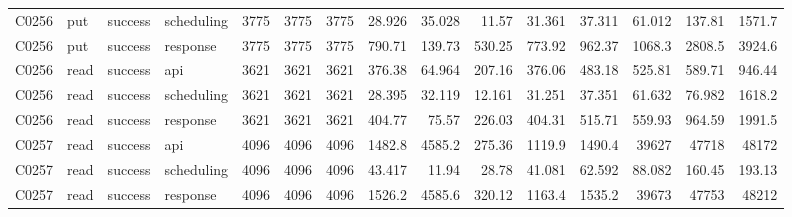 \begin{landscape}
\begin{longtable}{llllrrrrrrrrrrr}
C0256 & put & success & scheduling & 3775 & 3775 & 3775 & 28.926 & 35.028 & 11.57 & 31.361 & 37.311 & 61.012 & 137.81 & 1571.7\\
C0256 & put & success & response & 3775 & 3775 & 3775 & 790.71 & 139.73 & 530.25 & 773.92 & 962.37 & 1068.3 & 2808.5 & 3924.6\\
C0256 & read & success & api & 3621 & 3621 & 3621 & 376.38 & 64.964 & 207.16 & 376.06 & 483.18 & 525.81 & 589.71 & 946.44\\
C0256 & read & success & scheduling & 3621 & 3621 & 3621 & 28.395 & 32.119 & 12.161 & 31.251 & 37.351 & 61.632 & 76.982 & 1618.2\\
C0256 & read & success & response & 3621 & 3621 & 3621 & 404.77 & 75.57 & 226.03 & 404.31 & 515.71 & 559.93 & 964.59 & 1991.5\\
C0257 & read & success & api & 4096 & 4096 & 4096 & 1482.8 & 4585.2 & 275.36 & 1119.9 & 1490.4 & 39627 & 47718 & 48172\\
C0257 & read & success & scheduling & 4096 & 4096 & 4096 & 43.417 & 11.94 & 28.78 & 41.081 & 62.592 & 88.082 & 160.45 & 193.13\\
C0257 & read & success & response & 4096 & 4096 & 4096 & 1526.2 & 4585.6 & 320.12 & 1163.4 & 1535.2 & 39673 & 47753 & 48212\\
\end{longtable}
\normalsize
\end{landscape}


